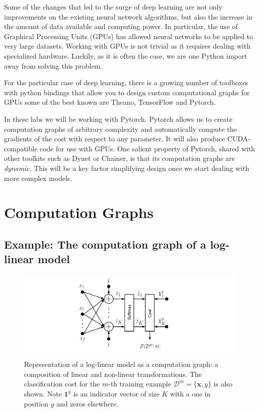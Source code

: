 Some of the changes that led to the surge of deep learning are not only
improvements on the existing neural network algorithms, but also
the increase in the amount of data available and computing power. In
particular, the use of Graphical Processing Units (GPUs) has allowed neural
networks to be applied to very large datasets. Working with GPUs is not trivial
as it requires dealing with specialized hardware. Luckily, as it is often the
case, we are one Python import away from solving this problem.

For the particular case of deep learning, there is a growing number of
toolboxes with python bindings that allow you to design custom computational
graphs for GPUs some of the best known are
Theano\footnotemark{},
TensorFlow\footnotemark{} and
Pytorch\footnotemark{}.

In these labs we will be working with Pytorch. Pytorch allows us to create
computation graphs of arbitrary complexity and automatically compute the
gradients of the cost with respect to any parameter. It will also produce
CUDA-compatible code for use with GPUs. One salient property of Pytorch, shared
with other toolkits such as Dynet or Chainer, is that its computation graphs
are \textit{dynamic}. This will be a key factor simplifying design once we
start dealing with more complex models.

\section{Computation Graphs}

\subsection{Example: The computation graph of a log-linear model}

\begin{figure}[!h]
\centering
\includegraphics[scale=0.6]{figs/deep_learning/LogLin.pdf}
\caption{Representation of a log-linear model as a computation graph: a
composition of linear and non-linear transformations. The classification cost
for the $m$-th training example $\mathcal{D}^m=\{\mathbf{x}, y\}$ is also
shown. Note $\mathbf{1}^y$ is an indicator vector of size $K$ with a one in
position $y$ and zeros elsewhere.}
\label{fig:LogLinear}
\end{figure}

